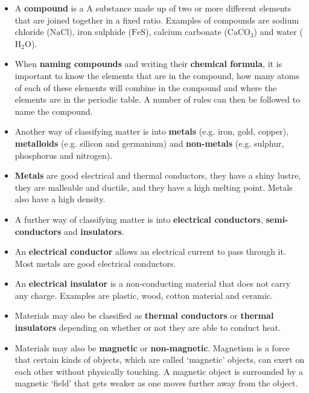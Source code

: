 \begin{itemize}[noitemsep]
\label{m38706*uid124}\item A \textbf{compound} is a A substance made up of two or more different elements that are joined together in a fixed ratio. Examples of compounds are sodium chloride ($\text{NaCl}$), iron sulphide ($\text{FeS}$), calcium carbonate (${\text{CaCO}}_{3}$) and water (${\text{H}}_{2}\text{O}$).
\label{m38706*uid125}\item When \textbf{naming compounds} and writing their \textbf{chemical formula}, it is important to know the elements that are in the compound, how many atoms of each of these elements will combine in the compound and where the elements are in the periodic table. A number of rules can then be followed to name the compound.
\label{m38706*uid126}\item Another way of classifying matter is into \textbf{metals} (e.g. iron, gold, copper), \textbf{metalloids} (e.g. silicon and germanium) and \textbf{non-metals} (e.g. sulphur, phosphorus and nitrogen).
\label{m38706*uid127}\item \textbf{Metals} are good electrical and thermal conductors, they have a shiny lustre, they are malleable and ductile, and they have a high melting point. Metals also have a high density. 
\label{m38706*uid128}\item A further way of classifying matter is into \textbf{electrical conductors}, \textbf{semi-conductors} and \textbf{insulators}.
\label{m38706*uid129}\item An \textbf{electrical conductor} allows an electrical current to pass through it. Most metals are good electrical conductors.
\label{m38706*uid130}\item An \textbf{electrical insulator} is a non-conducting material that does not carry any charge. Examples are plastic, wood, cotton material and ceramic.
\label{m38706*uid131}\item Materials may also be classified as \textbf{thermal conductors} or \textbf{thermal insulators} depending on whether or not they are able to conduct heat.
\label{m38706*uid132}\item Materials may also be \textbf{magnetic} or \textbf{non-magnetic}. Magnetism is a force that certain kinds of objects, which are called ‘magnetic’ objects, can exert on each other without physically touching. A magnetic object is surrounded by a magnetic ‘field’ that gets weaker as one moves further away from the object.

\end{itemize} \pagebreak

